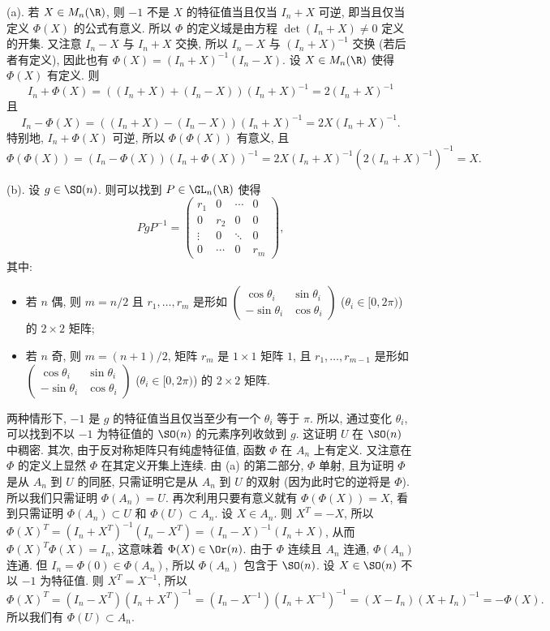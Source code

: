 \begin{solution}
(a). 若 $X \in M_n(\R)$, 则 $-1$ 不是 $X$ 的特征值当且仅当 $I_n + X$ 可逆, 即当且仅当定义 $\Phi(X)$ 的公式有意义. 所以 $\Phi$ 的定义域是由方程 $\det(I_n + X) \neq 0$ 定义的开集. 又注意 $I_n - X$ 与 $I_n + X$ 交换, 所以 $I_n - X$ 与 $(I_n + X)^{-1}$ 交换 (若后者有定义), 因此也有 $\Phi(X) = (I_n + X)^{-1}(I_n - X)$.
设 $X \in M_n(\R)$ 使得 $\Phi(X)$ 有定义. 则
\[
I_n + \Phi(X) = ((I_n + X) + (I_n - X))(I_n + X)^{-1} = 2(I_n + X)^{-1}
\]
且
\[
I_n - \Phi(X) = ((I_n + X) - (I_n - X))(I_n + X)^{-1} = 2X(I_n + X)^{-1}.
\]
特别地, $I_n + \Phi(X)$ 可逆, 所以 $\Phi(\Phi(X))$ 有意义, 且
\[
\Phi(\Phi(X)) = (I_n - \Phi(X))(I_n + \Phi(X))^{-1} = 2X(I_n + X)^{-1}(2(I_n + X)^{-1})^{-1} = X.
\]

(b). 设 $g \in \SO(n)$. 则可以找到 $P \in \GL_n(\R)$ 使得
\[
PgP^{-1} = \begin{pmatrix} r_1 & 0 & \cdots & 0 \\ 0 & r_2 & 0 & 0 \\ \vdots & 0 & \ddots & 0 \\ 0 & \cdots & 0 & r_m \end{pmatrix},
\]
其中:
\begin{itemize}
\item 若 $n$ 偶, 则 $m = n/2$ 且 $r_1, \ldots, r_m$ 是形如 $\begin{pmatrix} \cos\theta_i & \sin\theta_i \\ -\sin\theta_i & \cos\theta_i \end{pmatrix}$ ($\theta_i \in [0, 2\pi)$) 的 $2 \times 2$ 矩阵;
\item 若 $n$ 奇, 则 $m = (n+1)/2$, 矩阵 $r_m$ 是 $1 \times 1$ 矩阵 $1$, 且 $r_1, \ldots, r_{m-1}$ 是形如 $\begin{pmatrix} \cos\theta_i & \sin\theta_i \\ -\sin\theta_i & \cos\theta_i \end{pmatrix}$ ($\theta_i \in [0, 2\pi)$) 的 $2 \times 2$ 矩阵.
\end{itemize}
两种情形下, $-1$ 是 $g$ 的特征值当且仅当至少有一个 $\theta_i$ 等于 $\pi$. 所以, 通过变化 $\theta_i$, 可以找到不以 $-1$ 为特征值的 $\SO(n)$ 的元素序列收敛到 $g$. 这证明 $U$ 在 $\SO(n)$ 中稠密.
其次, 由于反对称矩阵只有纯虚特征值, 函数 $\Phi$ 在 $A_n$ 上有定义. 又注意在 $\Phi$ 的定义上显然 $\Phi$ 在其定义开集上连续. 由 (a) 的第二部分, $\Phi$ 单射, 且为证明 $\Phi$ 是从 $A_n$ 到 $U$ 的同胚, 只需证明它是从 $A_n$ 到 $U$ 的双射 (因为此时它的逆将是 $\Phi$). 所以我们只需证明 $\Phi(A_n) = U$. 再次利用只要有意义就有 $\Phi(\Phi(X)) = X$, 看到只需证明 $\Phi(A_n) \subset U$ 和 $\Phi(U) \subset A_n$.
设 $X \in A_n$. 则 $X^T = -X$, 所以 $\Phi(X)^T = (I_n + X^T)^{-1}(I_n - X^T) = (I_n - X)^{-1}(I_n + X)$, 从而 $\Phi(X)^T\Phi(X) = I_n$, 这意味着 $\Phi(X) \in \Or(n)$. 由于 $\Phi$ 连续且 $A_n$ 连通, $\Phi(A_n)$ 连通. 但 $I_n = \Phi(0) \in \Phi(A_n)$, 所以 $\Phi(A_n)$ 包含于 $\SO(n)$.
设 $X \in \SO(n)$ 不以 $-1$ 为特征值. 则 $X^T = X^{-1}$, 所以
\[
\Phi(X)^T = (I_n - X^T)(I_n + X^T)^{-1} = (I_n - X^{-1})(I_n + X^{-1})^{-1} = (X - I_n)(X + I_n)^{-1} = -\Phi(X).
\]
所以我们有 $\Phi(U) \subset A_n$.


\end{solution}
